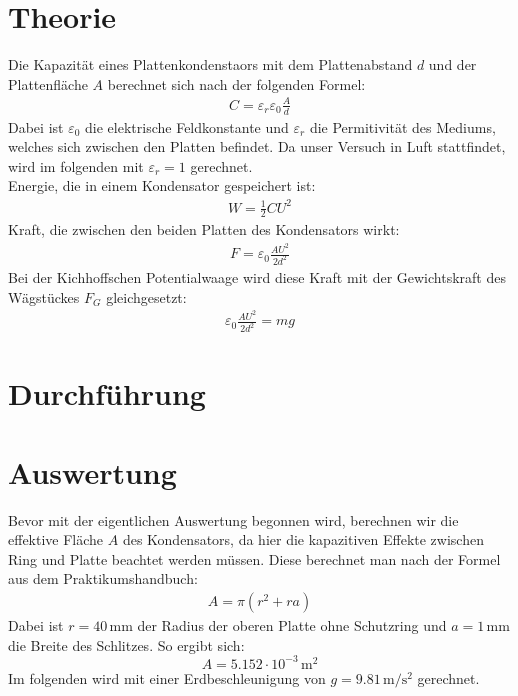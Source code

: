 \documentclass[12pt,a4paper,titlepage,headinclude,bibtotoc]{scrartcl}
\begin{document}
\section{Theorie}
\label{sec:theorie}
Die Kapazität eines Plattenkondenstaors mit dem Plattenabstand $d$ und der Plattenfläche $A$ berechnet sich nach der folgenden Formel:
\begin{align}
 C=\varepsilon_r\varepsilon_0\frac{A}{d}
 \label{eq:C_Pl}
\end{align}
Dabei ist $\varepsilon_0$ die elektrische Feldkonstante und $\varepsilon_r$ die Permitivität des Mediums, welches sich zwischen den Platten befindet.
Da unser Versuch in Luft stattfindet, wird im folgenden mit $\varepsilon_r=1$ gerechnet.\\
Energie, die in einem Kondensator gespeichert ist:
\begin{align}
 W=\frac{1}{2} C U^2
\end{align}
Kraft, die zwischen den beiden Platten des Kondensators wirkt:
\begin{align}
 F=\varepsilon_0\frac{A U^2}{2 d^2}
 \label{eq:F_Pl}
\end{align}
Bei der Kichhoffschen Potentialwaage wird diese Kraft mit der Gewichtskraft des Wägstückes $F_G$ gleichgesetzt:
\begin{align}
 \varepsilon_0\frac{A U^2}{2 d^2}=mg
 \label{eq:PotWaage}
\end{align}

\section{Durchführung}
\label{sec:durchfuehrung}

\section{Auswertung}
\label{sec:auswertung}
Bevor mit der eigentlichen Auswertung begonnen wird, berechnen wir die effektive Fläche $A$ des Kondensators, da hier die kapazitiven Effekte zwischen Ring und Platte beachtet werden müssen.
Diese berechnet man nach der Formel aus dem Praktikumshandbuch:
\begin{align*}
 A=\pi (r^2+ra)
\end{align*}
Dabei ist $r=40\,$mm der Radius der oberen Platte ohne Schutzring und $a=1\,$mm die Breite des Schlitzes.
So ergibt sich: $$A=5.152 \cdot 10^{-3}\,\si{\meter^2}$$
Im folgenden wird mit einer Erdbeschleunigung von $g=9.81\,\si{\meter\per\second^2}$ gerechnet.
\end{document}
